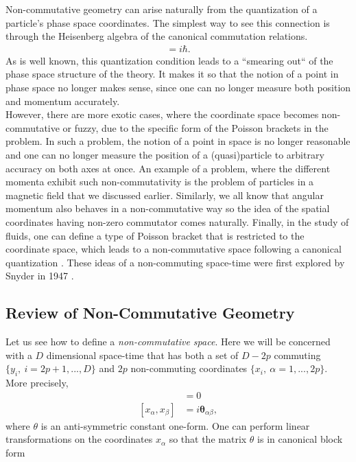     Non-commutative geometry can arise naturally from the quantization of a particle's phase space coordinates. The simplest way to see this connection is through the Heisenberg algebra of the canonical commutation relations. 
    \begin{align}
        [\hat{x}, \hat{p}] = i \hbar.
    \end{align}
    As is well known, this quantization condition leads to a ``smearing out`` of the phase space structure of the theory. It makes it so that the notion of a point in phase space no longer makes sense, since one can no longer measure both position and momentum accurately. \\
    \indent However, there are more exotic cases, where the coordinate space becomes non-commutative or fuzzy, due to the specific form of the Poisson brackets in the problem. In such a problem, the notion of a point in space is no longer reasonable and one can no longer measure the position of a (quasi)particle to arbitrary accuracy on both axes at once. An example of a problem, where the different momenta exhibit such non-commutativity is the problem of particles in a magnetic field that we discussed earlier. Similarly, we all know that angular momentum also behaves in a non-commutative way so the idea of the spatial coordinates having non-zero commutator comes naturally. Finally, in the study of fluids, one can define a type of Poisson bracket that is restricted to the coordinate space, which leads to a non-commutative space following a canonical quantization \cite{Jackiw2002}. These ideas of a non-commuting space-time were first explored by Snyder in 1947 \cite{Snyder1947_space_time, Snyder1947_EM}.


    \subsection{Review of Non-Commutative Geometry}
    Let us see how to define a \textit{non-commutative space}. Here we will be concerned with a $D$ dimensional space-time that has both a set of $D-2p$ commuting $\{ y_i, \ i=2p+1,...,D\}$ and $2p$ non-commuting coordinates $\{ x_i, \ \alpha =1,...,2p\}$. More precisely,
    \begin{align}
        [y_i, y_j] &=0\\
        [x_{\alpha}, x_{\beta}] &=i \bm{\theta}_{\alpha \beta}, \label{eq:space_time_commutations}
    \end{align}
    where $\theta$ is an anti-symmetric constant one-form. One can perform linear transformations on the coordinates $x_{\alpha}$ so that the matrix $\theta$ is in canonical block form

